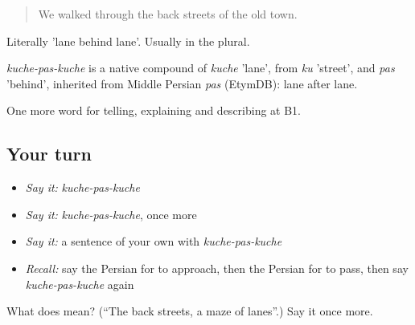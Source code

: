 \begin{quote}
We walked through the back streets of the old town.
\end{quote}

Literally 'lane behind lane'. Usually in the plural.

\begin{cousinweb}
\emph{kuche-pas-kuche} is a native compound of \emph{kuche} 'lane', from \emph{ku} 'street', and \emph{pas} 'behind', inherited from Middle Persian \emph{pas} (EtymDB): lane after lane.
\end{cousinweb}

\begin{grammarlens}[title={What you've built}]
One more word for telling, explaining and describing at B1.
\end{grammarlens}

\subsection*{Your turn}
\begin{itemize}
\raggedright
  \item \emph{Say it:} \emph{kuche-pas-kuche}
  \item \emph{Say it:} \emph{kuche-pas-kuche}, once more
  \item \emph{Say it:} a sentence of your own with \emph{kuche-pas-kuche}
  \item \emph{Recall:} say the Persian for to approach, then the Persian for to pass, then say \emph{kuche-pas-kuche} again
\end{itemize}

\begin{tcolorbox}[breakable,colback=teal!4,colframe=teal!35!black,title={Before you move on}]
What does    mean? (\textquotedblleft{}The back streets, a maze of lanes\textquotedblright{}.) Say it once more.
\end{tcolorbox}
